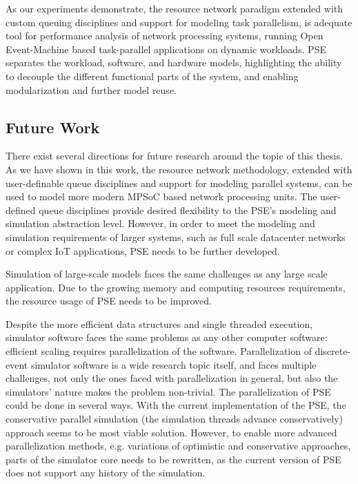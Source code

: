 As our experiments demonstrate, the resource network paradigm extended with custom queuing disciplines and support for modeling task parallelism, is adequate tool for performance analysis of network processing systems, running Open Event-Machine based task-parallel applications on dynamic workloads. PSE separates the workload, software, and hardware models, highlighting the ability to decouple the different functional parts of the system, and enabling modularization and further model reuse.

\subsection{Future Work}
There exist several directions for future research around the topic of this thesis. As we have shown in this work, the resource network methodology, extended with user-definable queue disciplines and support for modeling parallel systems, can be used to model more modern MPSoC based network processing units. The user-defined queue disciplines provide desired flexibility to the PSE's modeling and simulation abstraction level. However, in order to meet the modeling and simulation requirements of larger systems, such as full scale datacenter networks or complex IoT applications, PSE needs to be further developed.

Simulation of large-scale models faces the same challenges as any large scale application. Due to the growing memory and computing resources requirements, the resource usage of PSE needs to be improved.


Despite the more efficient data structures and single threaded execution, simulator software faces the same problems as any other computer software: efficient scaling requires parallelization of the software. Parallelization of discrete-event simulator software is a wide research topic itself, and faces multiple challenges, not only the ones faced with parallelization in general, but also the simulators' nature makes the problem non-trivial. The parallelization of PSE could be done in several ways. With the current implementation of the PSE, the conservative parallel simulation (the simulation threads advance conservatively) approach seems to be most viable solution. However, to enable more advanced parallelization methods, e.g. variations of optimistic and conservative approaches, parts of the simulator core needs to be rewritten, as the current version of PSE does not support any history of the simulation.

